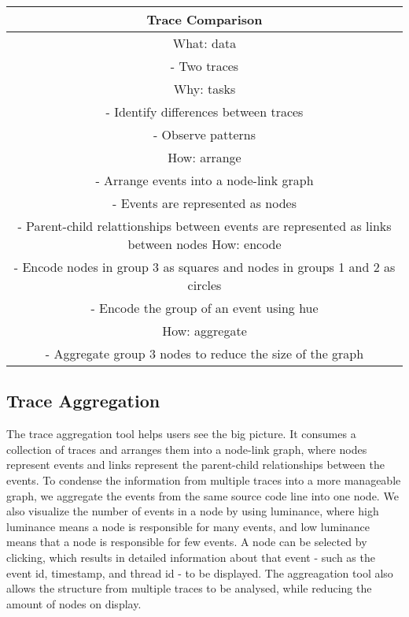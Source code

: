 \begin{center}
    \begin{tabular}{ |c| }
        \hline
        Trace Comparison  \\
        \hline
        What: data \\
         - Two traces \\
        \hline
        Why: tasks \\
         - Identify differences between traces \\
         - Observe patterns \\
        \hline
        How: arrange \\
         - Arrange events into a node-link graph \\
         - Events are represented as nodes \\
         - Parent-child relattionships between events are represented as links between nodes
        How: encode \\
         - Encode nodes in group 3 as squares and nodes in groups 1 and 2 as circles \\
         - Encode the group of an event using hue \\
        How: aggregate \\
         - Aggregate group 3 nodes to reduce the size of the graph
    \end{tabular}
\end{center}


\subsection{Trace Aggregation}

The trace aggregation tool helps users see the big picture. It consumes a collection of traces and arranges
them into a node-link graph, where nodes represent events and links represent the parent-child relationships between
the events. To condense the information from multiple traces into a more manageable graph, we aggregate the events
from the same source code line into one node. We also visualize the number of events in a node by using luminance, where high
luminance means a node is responsible for many events, and low luminance means that a node is responsible for few events. A node can
be selected by clicking, which results in detailed information about that event - such as the event id, timestamp, and thread id - to be displayed.
The aggreagation tool also allows the structure from multiple traces to be analysed, while reducing the amount of nodes on display.


